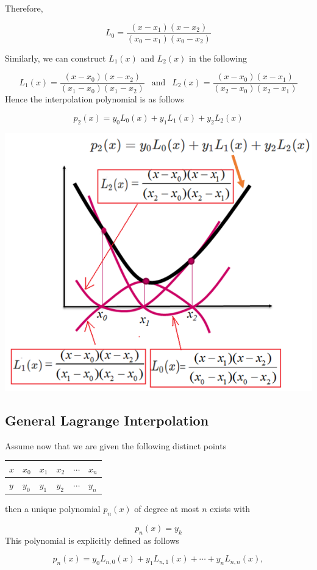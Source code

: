 \documentclass[
]{book}
\begin{document}
Therefore,

\[
L_0 = \frac{(x-x_1)(x-x_2)}{(x_0-x_1)(x_0-x_2)}
\]

Similarly, we can construct \(L_1(x)\) and \(L_2(x)\) in the following

\[
L_1(x) = \frac{(x-x_0)(x-x_2)}{(x_1-x_0)(x_1-x_2)} \ \ \text{ and } \ \ L_2(x) = \frac{(x-x_0)(x-x_1)}{(x_2-x_0)(x_2-x_1)}
\]
Hence the interpolation polynomial is as follows

\[
p_2(x) = y_0L_0(x) + y_1 L_1(x) + y_2 L_2(x)
\]

\begin{center}\includegraphics[width=0.55\linewidth]{img05/w05-degreeTwoLagrangeInterpolation} \end{center}

\hfill\break

\hypertarget{general-lagrange-interpolation}{%
\subsection{General Lagrange Interpolation}\label{general-lagrange-interpolation}}

Assume now that we are given the following distinct points

\begin{longtable}[]{@{}llllll@{}}
\toprule\noalign{}
\(x\) & \(x_0\) & \(x_1\) & \(x_2\) & \(\cdots\) & \(x_n\) \\
\midrule\noalign{}
\endhead
\bottomrule\noalign{}
\endlastfoot
\(y\) & \(y_0\) & \(y_1\) & \(y_2\) & \(\cdots\) & \(y_n\) \\
\end{longtable}

then a unique polynomial \(p_n(x)\) of degree at most \(n\) exists with

\[
p_n(x) = y_k
\]
This polynomial is explicitly defined as follows

\[
p_n(x) = y_0L_{n,0}(x) + y_1 L_{n,1}(x) + \cdots + y_nL_{n,n}(x),
\]
\end{document}

